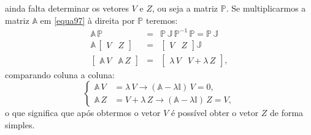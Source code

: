 \documentclass[12pt,openright,twoside,english,brazil]{abntex2}
\begin{document}
ainda falta determinar os vetores $V$ e $Z$, ou seja a matriz $\mathbb{P}$. Se multiplicarmos a matriz $\mathbb{A}$ em \ref{equa97} à direita por $\mathbb{P}$ teremos:
\begin{eqnarray}
\mathbb{A}\, \mathbb{P} & = & \mathbb{P} \, \mathbb{J} \, \mathbb{P}^{-1} \, \mathbb{P} = \mathbb{P} \, \mathbb{J} \nonumber \\
\mathbb{A} \, \begin{bmatrix}
               V & Z
               \end{bmatrix} & = & \begin{bmatrix}
                                    V & Z
                                   \end{bmatrix} \mathbb{J} \nonumber \\
 \begin{bmatrix}
  \mathbb{A} \, V & \mathbb{A} \, Z
 \end{bmatrix} & = & \begin{bmatrix}
                      \lambda \, V & V + \lambda\, Z
                     \end{bmatrix},  \nonumber
\end{eqnarray}
comparando coluna a coluna:
\begin{equation}
 \begin{cases}
  \mathbb{A} \, V & = \lambda \, V \rightarrow (\mathbb{A} - \lambda \mathbb{I}) \, V = 0, \\
  \mathbb{A} \, Z & = V + \lambda \, Z \rightarrow (\mathbb{A} - \lambda \mathbb{I}) \, Z = V,
 \end{cases}
 \label{equa106}
\end{equation}
o que significa que após obtermos o vetor $V$ é possível obter o vetor $Z$ de forma simples.
\end{document}
